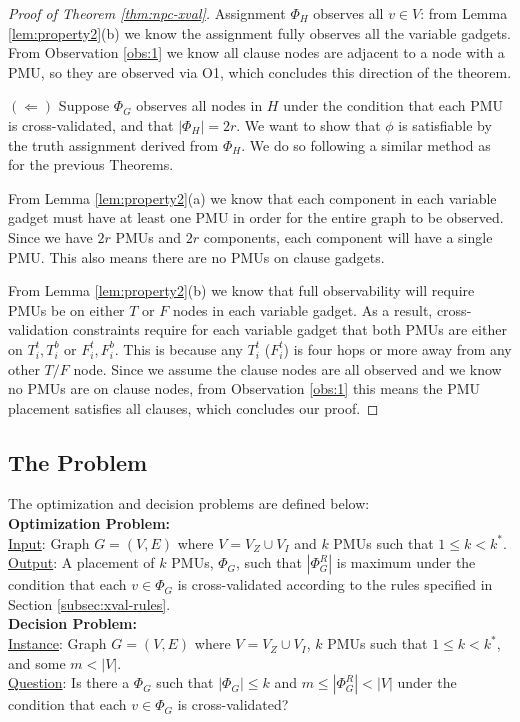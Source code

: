 \begin{proof}[Proof of Theorem \ref{thm:npc-xval}]
Assignment $\Phi_H$ observes all $v \in V$: from Lemma \ref{lem:property2}(b) we know the assignment fully observes all the variable gadgets. From Observation \ref{obs:1} we know all clause nodes are adjacent to a node with a PMU, so they are observed via O1, which concludes this direction of the theorem.

$(\Leftarrow)$ Suppose $\Phi_G$ observes all nodes in $H$
under the condition that each PMU is cross-validated, and that $|\Phi_H|=2r$. We want to show that
$\phi$ is satisfiable by the truth assignment derived from $\Phi_H$. We do so following a similar method as for the previous Theorems.

From Lemma \ref{lem:property2}(a) we know that each component in each variable gadget must have at least one PMU in order for the entire graph to be observed. Since we have $2r$ PMUs and $2r$ components, each component will have a single PMU. This also means there are no PMUs on clause gadgets.

From Lemma \ref{lem:property2}(b) we know that full observability will require PMUs  be on either $T$ or $F$ nodes in each variable gadget. As a result,  cross-validation constraints require for each variable gadget that both PMUs are either on $T_i^t, T_i^b$ or $F_i^t, F_i^b$. This is because any $T_i^t$ ($F_i^t$) is four hops or more away from any other $T/F$ node. Since we assume the clause nodes are all observed and we know no PMUs are on clause nodes, from Observation \ref{obs:1} this means the PMU placement satisfies all clauses, which concludes our proof.
\end{proof}



\subsection{The \xvalpart Problem}
\label{subsec:xvalpart}

The \xvalpart optimization and decision problems are defined below:
\\
{\bf \xvalpart Optimization Problem:} \\
	\indent \underline{Input}: Graph $G=(V,E)$ where $V=V_Z \cup V_I$ and $k$ PMUs such that $1 \leq k < k^*$. \\
	\indent \underline{Output}: A placement of $k$ PMUs, $\Phi_G$, such that $|\Phi^R_G|$ is maximum under the condition that
	each $v \in \Phi_G$ is cross-validated according to the rules specified in Section \ref{subsec:xval-rules}.
\\
{\bf \xvalpart Decision Problem:} \\
	\indent \underline{Instance}: Graph $G=(V,E)$ where $V=V_Z \cup V_I$, $k$ PMUs such that $1 \leq k < k^*$, and some $m<|V|$. \\
	\indent \underline{Question}: Is there a $\Phi_G$ such that $|\Phi_G| \leq k$ and $m \leq|\Phi^R_G| < |V|$ under the condition that each $v \in \Phi_G$ is cross-validated?

